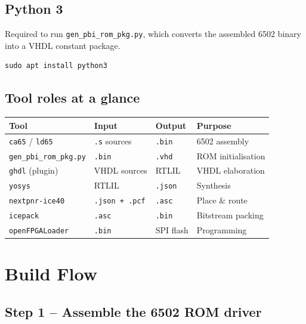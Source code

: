 \documentclass[11pt,a4paper]{article}
\newcommand{\cmd}[1]{\texttt{#1}}
\newcommand{\file}[1]{\texttt{#1}}
\begin{document}
\subsection{Python 3}

Required to run \file{gen\_pbi\_rom\_pkg.py}, which converts the
assembled 6502 binary into a VHDL constant package.

\begin{lstlisting}[style=shell]
sudo apt install python3
\end{lstlisting}

\subsection{Tool roles at a glance}

\begin{center}
\begin{tabular}{llll}
\toprule
\textbf{Tool} & \textbf{Input} & \textbf{Output} & \textbf{Purpose} \\
\midrule
\cmd{ca65} / \cmd{ld65}    & \file{.s} sources    & \file{.bin}      & 6502 assembly \\
\cmd{gen\_pbi\_rom\_pkg.py} & \file{.bin}          & \file{.vhd}      & ROM initialisation \\
\cmd{ghdl} (plugin)         & VHDL sources         & RTLIL            & VHDL elaboration \\
\cmd{yosys}                 & RTLIL                & \file{.json}     & Synthesis \\
\cmd{nextpnr-ice40}         & \file{.json + .pcf}  & \file{.asc}      & Place \& route \\
\cmd{icepack}               & \file{.asc}          & \file{.bin}      & Bitstream packing \\
\cmd{openFPGALoader}        & \file{.bin}          & SPI flash        & Programming \\
\bottomrule
\end{tabular}
\end{center}

\section{Build Flow}

\subsection{Step 1 -- Assemble the 6502 ROM driver}
\end{document}
